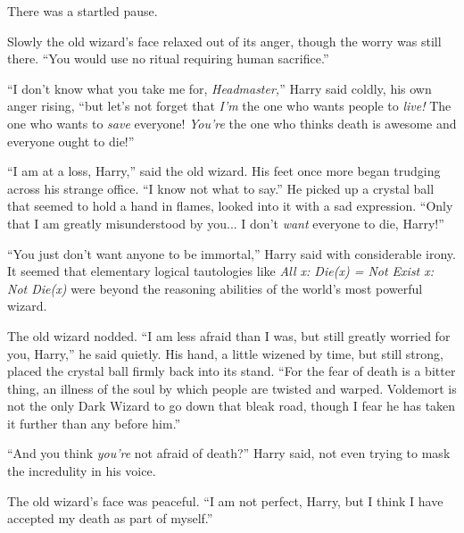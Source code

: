 There was a startled pause.

Slowly the old wizard's face relaxed out of its anger, though the worry was still there. ``You would use no ritual requiring human sacrifice.''

``I don't know what you take me for, \emph{Headmaster,}'' Harry said coldly, his own anger rising, ``but let's not forget that \emph{I'm} the one who wants people to \emph{live!} The one who wants to \emph{save} everyone! \emph{You're} the one who thinks death is awesome and everyone ought to die!''

``I am at a loss, Harry,'' said the old wizard. His feet once more began trudging across his strange office. ``I know not what to say.'' He picked up a crystal ball that seemed to hold a hand in flames, looked into it with a sad expression. ``Only that I am greatly misunderstood by you... I don't \emph{want} everyone to die, Harry!''

``You just don't want anyone to be immortal,'' Harry said with considerable irony. It seemed that elementary logical tautologies like \emph{All x: Die(x) = Not Exist x: Not Die(x)} were beyond the reasoning abilities of the world's most powerful wizard.

The old wizard nodded. ``I am less afraid than I was, but still greatly worried for you, Harry,'' he said quietly. His hand, a little wizened by time, but still strong, placed the crystal ball firmly back into its stand. ``For the fear of death is a bitter thing, an illness of the soul by which people are twisted and warped. Voldemort is not the only Dark Wizard to go down that bleak road, though I fear he has taken it further than any before him.''

``And you think \emph{you're} not afraid of death?'' Harry said, not even trying to mask the incredulity in his voice.

The old wizard's face was peaceful. ``I am not perfect, Harry, but I think I have accepted my death as part of myself.''

